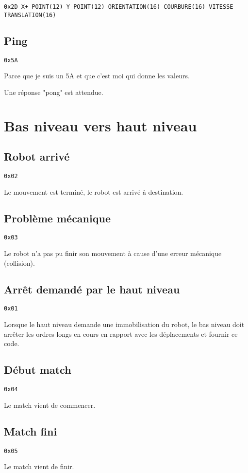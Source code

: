 \documentclass[a4paper, 12pt]{article}
\begin{document}
\texttt{0x2D X+ POINT(12) Y POINT(12) ORIENTATION(16) COURBURE(16) VITESSE TRANSLATION(16)}
    
\subsection{Ping}
    \texttt{0x5A}
    
    Parce que je suis un 5A et que c'est moi qui donne les valeurs.
    
    Une réponse "pong" est attendue.

\section{Bas niveau vers haut niveau}

\subsection{Robot arrivé}
    \texttt{0x02}
    
Le mouvement est terminé, le robot est arrivé à destination.
    
\subsection{Problème mécanique}
    \texttt{0x03}
    
Le robot n'a pas pu finir son mouvement à cause d'une erreur mécanique (collision).

\subsection{Arrêt demandé par le haut niveau}
    \texttt{0x01}
    
Lorsque le haut niveau demande une immobilisation du robot, le bas niveau doit arrêter les ordres longs en cours en rapport avec les déplacements et fournir ce code.
    
\subsection{Début match}
    \texttt{0x04}

Le match vient de commencer.
    
\subsection{Match fini}
    \texttt{0x05}
    
Le match vient de finir.
    
\end{document}
